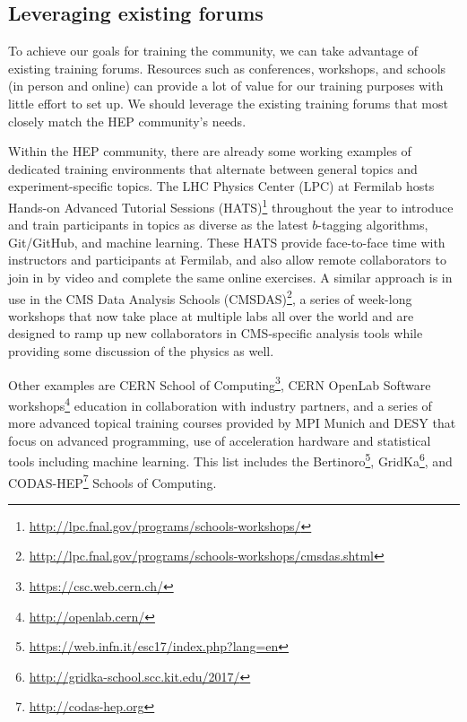 \documentclass[12pt,a4paper]{article}
\begin{document}

\subsection{Leveraging existing forums}

To achieve our goals for training the community, we can take advantage of
existing training forums. Resources such as conferences, workshops, and schools
(in person and online) can provide a lot of value for our training purposes with
little effort to set up. We should leverage the existing training forums that
most closely match the HEP community's needs.

Within the HEP community, there are already some working examples of dedicated
training environments that alternate between general topics and
experiment-specific topics. The LHC Physics Center (LPC) at Fermilab hosts
Hands-on Advanced Tutorial Sessions
(HATS)\footnote{\url{http://lpc.fnal.gov/programs/schools-workshops/}}
throughout the year to introduce and train participants in topics as diverse as
the latest $b$-tagging algorithms, Git/GitHub, and machine learning. These HATS
provide face-to-face time with instructors and participants at Fermilab, and
also allow remote collaborators to join in by video and complete the same online
exercises. A similar approach is in use in the CMS Data Analysis Schools
(CMSDAS)\footnote{\url{http://lpc.fnal.gov/programs/schools-workshops/cmsdas.shtml}},
a series of week-long workshops that now take place at multiple labs all over
the world and are designed to ramp up new collaborators in CMS-specific analysis
tools while providing some discussion of the physics as well.

Other examples are CERN School of
Computing\footnote{\url{https://csc.web.cern.ch/}}, CERN OpenLab Software
workshops\footnote{\url{http://openlab.cern/}} education in collaboration with
industry partners, and a series of more advanced topical training courses
provided by MPI Munich and DESY that focus on advanced programming, use of
acceleration hardware and statistical tools including machine learning. This
list includes the
Bertinoro\footnote{\url{https://web.infn.it/esc17/index.php?lang=en}}, 
GridKa\footnote{\url{http://gridka-school.scc.kit.edu/2017/}}, and
CODAS-HEP\footnote{\url{http://codas-hep.org}} Schools of Computing.
\end{document}
